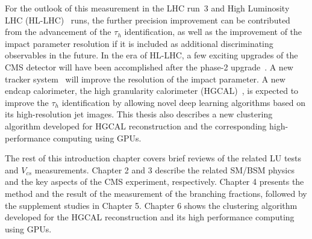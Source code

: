 For the outlook of this measurement in the LHC run~3 and High Luminosity LHC (HL-LHC)~\cite{Apollinari:2284929} runs, the further precision improvement can be contributed from the advancement of the $\tau_h$ identification, as well as the improvement of the impact parameter resolution if it is included as additional discriminating observables in the future. In the era of HL-LHC, a few exciting upgrades of the CMS detector will have been accomplished after the phase-2 upgrade~\cite{CMSCollaboration:2015zni}. A new tracker system~\cite{Klein:2017nke} will improve the resolution of the impact parameter. A new endcap calorimeter, the high granularity calorimeter (HGCAL)~\cite{Collaboration:2293646}, is expected to improve the $\tau_h$ identification by allowing novel deep learning algorithms based on its high-resolution jet images. This thesis also describes a new clustering algorithm developed for HGCAL reconstruction and the corresponding high-performance computing using GPUs.



The rest of this introduction chapter covers brief reviews of the related LU tests and $V_{cs}$ measurements. 
Chapter 2 and 3 describe the related SM/BSM physics and the key aspects of the CMS experiment, respectively.
Chapter 4 presents the method and the result of the measurement of the \PW branching fractions, followed by the supplement studies in Chapter 5.
Chapter 6 shows the clustering algorithm developed for the HGCAL reconstruction and its high performance computing using GPUs.


















